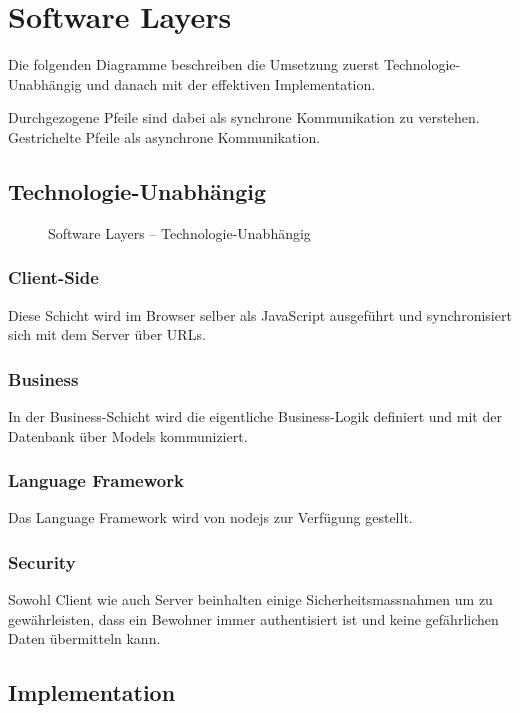 \section{Software Layers}

Die folgenden Diagramme beschreiben die Umsetzung zuerst Technologie-Unabhängig
und danach mit der effektiven Implementation.

Durchgezogene Pfeile sind dabei als synchrone Kommunikation zu verstehen.
Gestrichelte Pfeile als asynchrone Kommunikation.

\subsection*{Technologie-Unabhängig}

\begin{figure}[ht!]
	\centering{
		
	}

	\caption{Software Layers -- Technologie-Unabhängig}
\end{figure}

\subsubsection*{Client-Side}
Diese Schicht wird im Browser selber als JavaScript ausgeführt und synchronisiert sich mit dem Server über URLs.

\subsubsection*{Business}
In der Business-Schicht wird die eigentliche Business-Logik definiert und mit der Datenbank über Models kommuniziert.

\subsubsection*{Language Framework}
Das Language Framework wird von \gls{nodejs} zur Verfügung gestellt.

\subsubsection*{Security}
Sowohl Client wie auch Server beinhalten einige Sicherheitsmassnahmen um zu gewährleisten, dass ein \gls{Bewohner} immer authentisiert ist und keine gefährlichen Daten übermitteln kann.

\newpage
\subsection*{Implementation}


